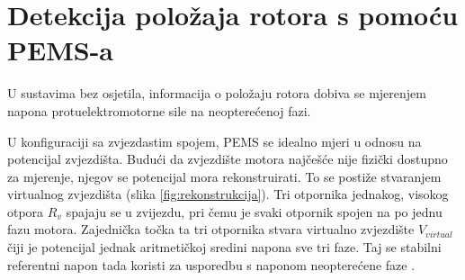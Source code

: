 \documentclass[diplomskirad]{fer}
\begin{document}
\section{Detekcija položaja rotora s pomoću PEMS-a}

U sustavima bez osjetila, informacija o položaju rotora dobiva se mjerenjem
napona protuelektromotorne sile na neopterećenoj fazi.

U konfiguraciji sa zvjezdastim spojem, PEMS se idealno mjeri u odnosu na
potencijal zvjezdišta. Budući da zvjezdište motora najčešće nije fizički
dostupno za mjerenje, njegov se potencijal mora rekonstruirati. To se postiže
stvaranjem virtualnog zvjezdišta (slika \ref{fig:rekonstrukcija}). Tri
otpornika jednakog, visokog otpora $R_v$ spajaju se u zvijezdu, pri čemu je
svaki otpornik spojen na po jednu fazu motora. Zajednička točka ta tri
otpornika stvara virtualno zvjezdište $V_{virtual}$ čiji je potencijal jednak
aritmetičkoj sredini napona sve tri faze. Taj se stabilni referentni napon tada
koristi za usporedbu s naponom neopterećene faze \cite{ST_AN1946}.
\end{document}
